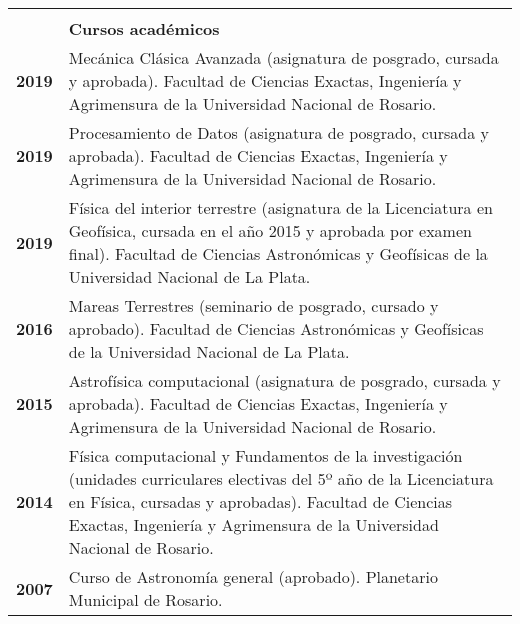\documentclass[12pt,a4paper]{article}
\begin{document}
\begin{longtable}[t]{r p{12cm}}
  & \\
  & \textbf{Cursos académicos} \\
 \cline{2-2}
 \textbf{2019} & Mecánica Clásica Avanzada (asignatura de posgrado, cursada y aprobada). Facultad de Ciencias Exactas, Ingeniería y Agrimensura de la Universidad Nacional de Rosario. \\
 \textbf{2019} & Procesamiento de Datos (asignatura de posgrado, cursada y aprobada). Facultad de Ciencias Exactas, Ingeniería y Agrimensura de la Universidad Nacional de Rosario. \\
 \textbf{2019} & Física del interior terrestre (asignatura de la Licenciatura en Geofísica, cursada en el año 2015 y aprobada por examen final). Facultad de Ciencias Astronómicas y Geofísicas de la Universidad Nacional de La Plata. \\
 \textbf{2016} & Mareas Terrestres (seminario de posgrado, cursado y aprobado). Facultad de Ciencias Astronómicas y Geofísicas de la Universidad Nacional de La Plata. \\
 \textbf{2015} & Astrofísica computacional (asignatura de posgrado, cursada y aprobada). Facultad de Ciencias Exactas, Ingeniería y Agrimensura de la Universidad Nacional de Rosario. \\
 \textbf{2014} & Física computacional y Fundamentos de la investigación (unidades curriculares electivas del 5º año de la Licenciatura en Física, cursadas y aprobadas).  Facultad de Ciencias Exactas, Ingeniería y Agrimensura de la Universidad Nacional de Rosario. \\
 \textbf{2007} & Curso de Astronomía general (aprobado). Planetario Municipal de Rosario. \\


\end{longtable}
\end{document}
